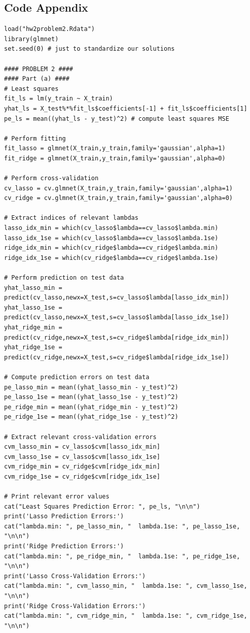 \documentclass[12pt]{article}
\newcommand{\1}{\mathbbm{1}}
\begin{document}
\subsection{Code Appendix}
\label{sec:code}
\begin{verbatim}
load("hw2problem2.Rdata")
library(glmnet)
set.seed(0) # just to standardize our solutions

#### PROBLEM 2 ####
#### Part (a) ####
# Least squares
fit_ls = lm(y_train ~ X_train)
yhat_ls = X_test%*%fit_ls$coefficients[-1] + fit_ls$coefficients[1]
pe_ls = mean((yhat_ls - y_test)^2) # compute least squares MSE

# Perform fitting
fit_lasso = glmnet(X_train,y_train,family='gaussian',alpha=1)
fit_ridge = glmnet(X_train,y_train,family='gaussian',alpha=0)

# Perform cross-validation
cv_lasso = cv.glmnet(X_train,y_train,family='gaussian',alpha=1)
cv_ridge = cv.glmnet(X_train,y_train,family='gaussian',alpha=0)

# Extract indices of relevant lambdas
lasso_idx_min = which(cv_lasso$lambda==cv_lasso$lambda.min)
lasso_idx_1se = which(cv_lasso$lambda==cv_lasso$lambda.1se)
ridge_idx_min = which(cv_ridge$lambda==cv_ridge$lambda.min)
ridge_idx_1se = which(cv_ridge$lambda==cv_ridge$lambda.1se)

# Perform prediction on test data
yhat_lasso_min = predict(cv_lasso,newx=X_test,s=cv_lasso$lambda[lasso_idx_min])
yhat_lasso_1se = predict(cv_lasso,newx=X_test,s=cv_lasso$lambda[lasso_idx_1se])
yhat_ridge_min = predict(cv_ridge,newx=X_test,s=cv_ridge$lambda[ridge_idx_min])
yhat_ridge_1se = predict(cv_ridge,newx=X_test,s=cv_ridge$lambda[ridge_idx_1se])

# Compute prediction errors on test data
pe_lasso_min = mean((yhat_lasso_min - y_test)^2)
pe_lasso_1se = mean((yhat_lasso_1se - y_test)^2)
pe_ridge_min = mean((yhat_ridge_min - y_test)^2)
pe_ridge_1se = mean((yhat_ridge_1se - y_test)^2)

# Extract relevant cross-validation errors
cvm_lasso_min = cv_lasso$cvm[lasso_idx_min]
cvm_lasso_1se = cv_lasso$cvm[lasso_idx_1se]
cvm_ridge_min = cv_ridge$cvm[ridge_idx_min]
cvm_ridge_1se = cv_ridge$cvm[ridge_idx_1se]

# Print relevant error values
cat("Least Squares Prediction Error: ", pe_ls, "\n\n")
print('Lasso Prediction Errors:')
cat("lambda.min: ", pe_lasso_min, "  lambda.1se: ", pe_lasso_1se, "\n\n")
print('Ridge Prediction Errors:')
cat("lambda.min: ", pe_ridge_min, "  lambda.1se: ", pe_ridge_1se, "\n\n")
print('Lasso Cross-Validation Errors:')
cat("lambda.min: ", cvm_lasso_min, "  lambda.1se: ", cvm_lasso_1se, "\n\n")
print('Ridge Cross-Validation Errors:')
cat("lambda.min: ", cvm_ridge_min, "  lambda.1se: ", cvm_ridge_1se, "\n\n")


\end{verbatim}
\end{document}
